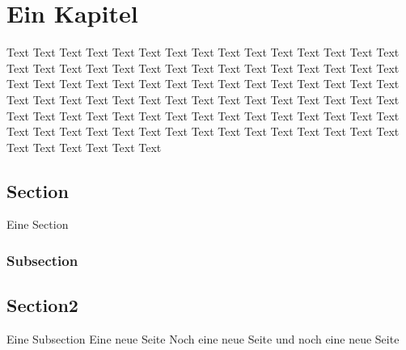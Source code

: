 \chapter{Ein Kapitel}
    Text Text Text Text Text Text Text Text Text Text Text Text Text Text Text Text Text Text Text Text Text Text Text Text 
    Text Text Text Text Text Text Text Text Text Text Text Text Text Text Text Text Text Text Text Text Text Text Text Text
    Text Text Text Text Text Text Text Text Text Text Text Text Text Text Text Text Text Text Text Text Text Text Text Text
    Text Text Text Text Text Text Text Text Text Text Text Text Text Text Text Text Text Text Text Text Text Text Text Text
    \section{Section}
        Eine Section
        \subsection{Subsection}
        
    \section{Section2}
        Eine Subsection
        \newpage
        Eine neue Seite
        \newpage 
        Noch eine neue Seite
        \newpage    
        und noch eine neue Seite
